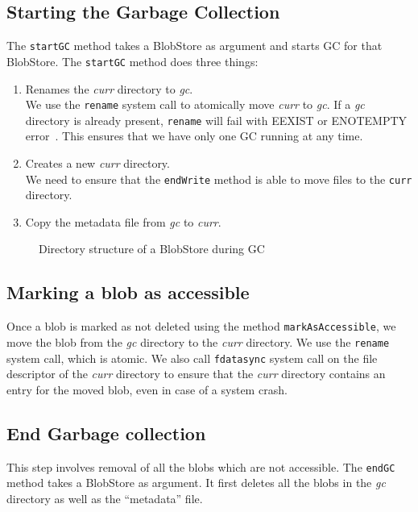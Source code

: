 \subsection{Starting the Garbage Collection} \label{startgc}
The \texttt{startGC} method takes a BlobStore as argument and starts GC for that BlobStore.
The \texttt{startGC} method does three things:
  \begin{enumerate}
      \item Renames the \textit{curr} directory to \textit{gc}. \\
        We use the \texttt{rename} system call to atomically move \textit{curr} to \textit{gc}. If a \textit{gc} directory is already present, \texttt{rename} will fail with EEXIST or ENOTEMPTY error~\cite{renamemanpage}. This ensures that we have only one GC running at any time.
      \item Creates a new \textit{curr} directory. \\
        We need to ensure that the \texttt{endWrite} method is able to move files to the \texttt{curr} directory.
      \item Copy the metadata file from \textit{gc} to \textit{curr}. \\
  \end{enumerate}

\begin{figure}[hbt]
  \caption{Directory structure of a BlobStore during GC}
  \label{fig:blobstore-dirstructure-gc}
\end{figure}

\subsection{Marking a blob as accessible}
Once a blob is marked as not deleted using the method \texttt{markAsAccessible}, we move the blob from the \textit{gc} directory to the \textit{curr} directory.
We use the \texttt{rename} system call, which is atomic.
We also call \texttt{fdatasync} system call on the file descriptor of the \textit{curr} directory to ensure that the \textit{curr} directory contains an entry for the moved blob, even in case of a system crash.

\subsection{End Garbage collection}
This step involves removal of all the blobs which are not accessible. The \texttt{endGC} method takes a BlobStore as argument. It first deletes all the blobs in the \textit{gc} directory as well as the ``metadata'' file.

